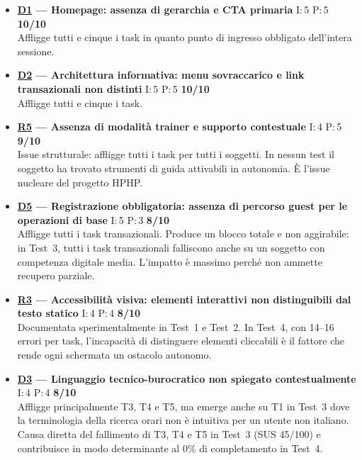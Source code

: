 \documentclass[11pt,a4paper]{article}
\begin{document}
\begin{tcolorbox}[colback=backgroundColor,colframe=borderColor,arc=2mm]
\begin{itemize}[leftmargin=*,itemsep=8pt]

    \item \textbf{\hyperref[iss:D1]{D1} --- Homepage: assenza di gerarchia 
    e CTA primaria}
    \hfill I:\,5 \textbar{} P:\,5 \textbar{} \textbf{10/10}\\
    Affligge tutti e cinque i task in quanto punto di ingresso obbligato 
    dell'intera sessione. 

    \item \textbf{\hyperref[iss:D2]{D2} --- Architettura informativa:
    menu sovraccarico e link transazionali non distinti}
    \hfill I:\,5 \textbar{} P:\,5 \textbar{} \textbf{10/10}\\
    Affligge tutti e cinque i task.

    \item \textbf{\hyperref[iss:R5]{R5} --- Assenza di modalità trainer 
    e supporto contestuale}
    \hfill I:\,4 \textbar{} P:\,5 \textbar{} \textbf{9/10}\\
    Issue strutturale: affligge tutti i task per tutti i soggetti. 
    In nessun test il soggetto ha trovato strumenti di guida attivabili 
    in autonomia. È l'issue nucleare del 
    progetto HPHP.

    \item \textbf{\hyperref[iss:D5]{D5} --- Registrazione obbligatoria:
    assenza di percorso guest per le operazioni di base}
    \hfill I:\,5 \textbar{} P:\,3 \textbar{} \textbf{8/10}\\
    Affligge tutti i task transazionali. Produce un blocco 
    totale e non aggirabile: in Test~3, tutti i task transazionali 
    falliscono anche su un soggetto con competenza digitale media. 
    L'impatto è massimo perché non ammette recupero parziale.

    \item \textbf{\hyperref[iss:R3]{R3} --- Accessibilità visiva: 
    elementi interattivi non distinguibili dal testo statico}
    \hfill I:\,4 \textbar{} P:\,4 \textbar{} \textbf{8/10}\\
    Documentata sperimentalmente in Test~1 e Test~2. 
    In Test~4, con 14--16 errori per task, l'incapacità di distinguere 
    elementi cliccabili è il fattore che rende ogni schermata un ostacolo 
    autonomo.

    \item \textbf{\hyperref[iss:D3]{D3} --- Linguaggio tecnico-burocratico 
    non spiegato contestualmente}
    \hfill I:\,4 \textbar{} P:\,4 \textbar{} \textbf{8/10}\\
    Affligge principalmente T3, T4 e T5, ma emerge anche su T1 in Test~3 
    dove la terminologia della ricerca orari non è intuitiva per un utente 
    non italiano. Causa diretta del fallimento di T3, T4 e T5 in Test~3 
    (SUS 45/100) e contribuisce in modo determinante al 0\% di 
    completamento in Test~4.


\end{itemize}
\end{tcolorbox}
\end{document}
